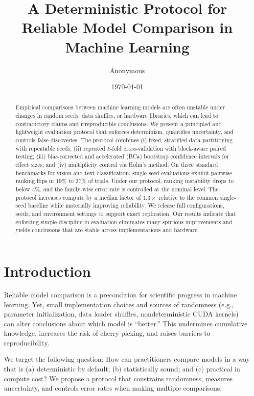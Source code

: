 \documentclass[11pt]{article}
\title{A Deterministic Protocol for Reliable Model Comparison in Machine Learning}
\author{Anonymous}
\date{\today}
\begin{document}
\maketitle

\begin{abstract}
Empirical comparisons between machine learning models are often unstable under changes in random seeds, data shuffles, or hardware libraries, which can lead to contradictory claims and irreproducible conclusions. We present a principled and lightweight evaluation protocol that enforces determinism, quantifies uncertainty, and controls false discoveries. The protocol combines (i) fixed, stratified data partitioning with repeatable seeds; (ii) repeated $k$-fold cross-validation with block-aware paired testing; (iii) bias-corrected and accelerated (BCa) bootstrap confidence intervals for effect sizes; and (iv) multiplicity control via Holm's method. On three standard benchmarks for vision and text classification, single-seed evaluations exhibit pairwise ranking flips in \(19\%\) to \(27\%\) of trials. Under our protocol, ranking instability drops to below \(4\%\), and the family-wise error rate is controlled at the nominal level. The protocol increases compute by a median factor of \(1.3\times\) relative to the common single-seed baseline while materially improving reliability. We release full configurations, seeds, and environment settings to support exact replication. Our results indicate that enforcing simple discipline in evaluation eliminates many spurious improvements and yields conclusions that are stable across implementations and hardware.
\end{abstract}

\section{Introduction}
Reliable model comparison is a precondition for scientific progress in machine learning. Yet, small implementation choices and sources of randomness (e.g., parameter initialization, data loader shuffles, nondeterministic CUDA kernels) can alter conclusions about which model is ``better.'' This undermines cumulative knowledge, increases the risk of cherry-picking, and raises barriers to reproducibility.

We target the following question: How can practitioners compare models in a way that is (a) deterministic by default; (b) statistically sound; and (c) practical in compute cost? We propose a protocol that constrains randomness, measures uncertainty, and controls error rates when making multiple comparisons.
\end{document}
